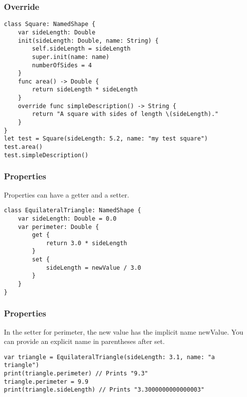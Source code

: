 \begin{frame}[fragile] \frametitle{Override}

\begin{lstlisting}[basicstyle=\scriptsize]
class Square: NamedShape {
    var sideLength: Double
    init(sideLength: Double, name: String) {
        self.sideLength = sideLength
        super.init(name: name)
        numberOfSides = 4
    }
    func area() -> Double {
        return sideLength * sideLength
    }
    override func simpleDescription() -> String {
        return "A square with sides of length \(sideLength)."
    }
}
let test = Square(sideLength: 5.2, name: "my test square")
test.area()
test.simpleDescription()
\end{lstlisting}

\end{frame}


\begin{frame}[fragile] \frametitle{Properties}

Properties can have a getter and a setter.

\begin{lstlisting}[basicstyle=\scriptsize]
class EquilateralTriangle: NamedShape {
    var sideLength: Double = 0.0
    var perimeter: Double {
        get {
            return 3.0 * sideLength
        }
        set {
            sideLength = newValue / 3.0
        }
    }
}
\end{lstlisting}


\end{frame}

\begin{frame}[fragile] \frametitle{Properties}

In the setter for perimeter, the new value has the implicit name newValue. You can provide an explicit name in parentheses after set.


\begin{lstlisting}[basicstyle=\scriptsize]
var triangle = EquilateralTriangle(sideLength: 3.1, name: "a triangle")
print(triangle.perimeter) // Prints "9.3"
triangle.perimeter = 9.9
print(triangle.sideLength) // Prints "3.3000000000000003"
\end{lstlisting}


\end{frame}

